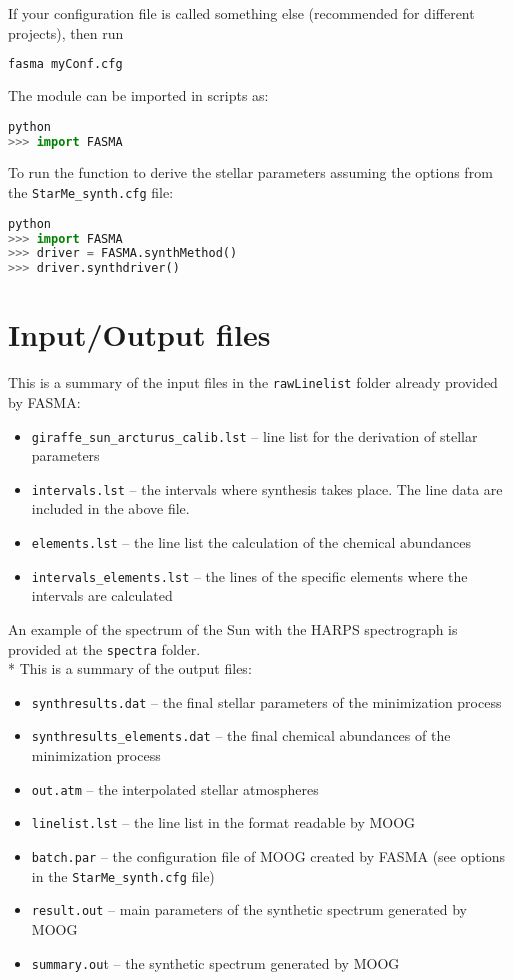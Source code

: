 \documentclass[a4paper,12pt]{article}
\begin{document}
If your configuration file is called something else (recommended for different projects), then run
\begin{lstlisting}[language=Python]
fasma myConf.cfg
\end{lstlisting}

The module can be imported in scripts as:
\begin{lstlisting}[language=Python]
python
>>> import FASMA
\end{lstlisting}

To run the function to derive the stellar parameters assuming the options from the \texttt{StarMe\_synth.cfg} file:
\begin{lstlisting}[language=Python]
python
>>> import FASMA
>>> driver = FASMA.synthMethod()
>>> driver.synthdriver()
\end{lstlisting}

\section{Input/Output files}

This is a summary of the input files in the \texttt{rawLinelist} folder already provided by FASMA:
\begin{itemize}
 \item \texttt{giraffe\_sun\_arcturus\_calib.lst} -- line list for the derivation of stellar parameters
 \item \texttt{intervals.lst} -- the intervals where synthesis takes place. The line data are included in the above file. 
 \item \texttt{elements.lst} -- the line list the calculation of the chemical abundances
 \item \texttt{intervals\_elements.lst} -- the lines of the specific elements where the intervals are calculated 
\end{itemize}

An example of the spectrum of the Sun with the HARPS spectrograph is provided at the \texttt{spectra} folder.
\\*
This is a summary of the output files:
\begin{itemize}
 \item \texttt{synthresults.dat} -- the final stellar parameters of the minimization process 
 \item \texttt{synthresults\_elements.dat} -- the final chemical abundances of the minimization process 
 \item \texttt{out.atm} -- the interpolated stellar atmospheres 
 \item \texttt{linelist.lst} -- the line list in the format readable by MOOG
 \item \texttt{batch.par} -- the configuration file of MOOG created by FASMA (see options in the \texttt{StarMe\_synth.cfg} file)
 \item \texttt{result.out} -- main parameters of the synthetic spectrum generated by MOOG
 \item \texttt{summary.ou}t -- the synthetic spectrum generated by MOOG
\end{itemize}
\end{document}
